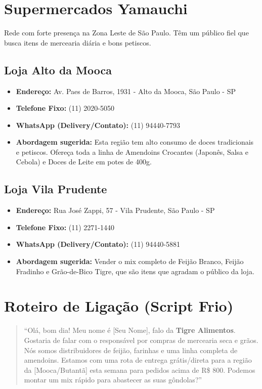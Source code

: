 \documentclass[12pt,a4paper]{article}
\begin{document}
\vspace{1cm}

\section{Supermercados Yamauchi}
Rede com forte presença na Zona Leste de São Paulo. Têm um público fiel que busca itens de mercearia diária e bons petiscos.

\subsection*{Loja Alto da Mooca}
\begin{itemize}
    \item \textbf{Endereço:} Av. Paes de Barros, 1931 - Alto da Mooca, São Paulo - SP
    \item \textbf{Telefone Fixo:} (11) 2020-5050
    \item \textbf{WhatsApp (Delivery/Contato):} (11) 94440-7793
    \item \textbf{Abordagem sugerida:} Esta região tem alto consumo de doces tradicionais e petiscos. Ofereça toda a linha de Amendoins Crocantes (Japonês, Salsa e Cebola) e Doces de Leite em potes de 400g.
\end{itemize}

\subsection*{Loja Vila Prudente}
\begin{itemize}
    \item \textbf{Endereço:} Rua José Zappi, 57 - Vila Prudente, São Paulo - SP
    \item \textbf{Telefone Fixo:} (11) 2271-1440
    \item \textbf{WhatsApp (Delivery/Contato):} (11) 94440-5881
    \item \textbf{Abordagem sugerida:} Vender o mix completo de Feijão Branco, Feijão Fradinho e Grão-de-Bico Tigre, que são itens que agradam o público da loja.
\end{itemize}

\vspace{1cm}

\section{Roteiro de Ligação (Script Frio)}
\begin{quotation}
\noindent ``Olá, bom dia! Meu nome é [Seu Nome], falo da \textbf{Tigre Alimentos}. Gostaria de falar com o responsável por compras de mercearia seca e grãos. Nós somos distribuidores de feijão, farinhas e uma linha completa de amendoins. Estamos com uma rota de entrega grátis/direta para a região da [Mooca/Butantã] esta semana para pedidos acima de R\$ 800. Podemos montar um mix rápido para abastecer as suas gôndolas?''
\end{quotation}
\end{document}
